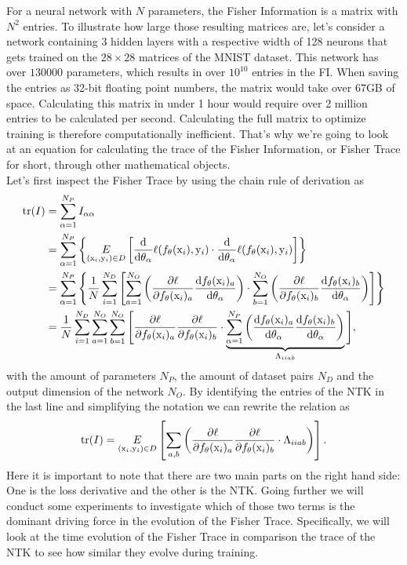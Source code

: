 For a neural network with $N$ parameters, the Fisher Information is a matrix with $N^2$ entries. To illustrate how large those resulting matrices are, let's consider a network containing 3 hidden layers with a respective width of 128 neurons that gets trained on the $28\times28$ matrices of the MNIST dataset. This network has over $130000$ parameters, which results in over $10^{10}$ entries in the FI. When saving the entries as 32-bit floating point numbers, the matrix would take over 67GB of space. Calculating  this matrix in under 1 hour would require over 2 million entries to be calculated per second. Calculating the full matrix to optimize training is therefore computationally inefficient. That's why we're going to look at an equation for calculating the trace of the Fisher Information, or Fisher Trace for short, through other mathematical objects.\\
Let's first inspect the Fisher Trace by using the chain rule of derivation as
\begin{equation}
	\begin{split}
		\mathrm{tr}(I) &= \sum_{\alpha = 1}^{N_P} I_{\alpha\alpha}\\
		&= \sum_{\alpha = 1}^{N_P} \left\{\underset{(\mathrm{x}_i, \mathrm{y}_i) \in D}{E} \left[\frac{\mathrm{d}}{\mathrm{d}\theta_\alpha}\ell(f_\theta(\mathrm{x}_i),\mathrm{y}_i)\cdot \frac{\mathrm{d}}{\mathrm{d}\theta_\alpha}\ell(f_\theta(\mathrm{x}_i),\mathrm{y}_i)\right]\right\}\\
		&= \sum_{\alpha = 1}^{N_P} \left\{ \frac{1}{N} \sum_{i = 1}^{N_D} \left[\sum_{a=1}^{N_O}\left(\frac{\partial\ell}{\partial f_\theta(\mathrm{x}_i)_a}\frac{\mathrm{d}f_\theta(\mathrm{x}_i)_a}{\mathrm{d}\theta_\alpha}\right)\cdot\sum_{b=1}^{N_O}\left(\frac{\partial\ell}{\partial f_\theta(\mathrm{x}_i)_b}\frac{\mathrm{d}f_\theta(\mathrm{x}_i)_b}{\mathrm{d}\theta_\alpha}\right)\right]\right\}\\
		&= \frac{1}{N} \sum_{i = 1}^{N_D} \sum_{a=1}^{N_O} \sum_{b=1}^{N_O} \Bigg[\frac{\partial\ell}{\partial f_\theta(\mathrm{x}_i)_a}\frac{\partial\ell}{\partial f_\theta(\mathrm{x}_i)_b} \cdot\underbrace{ \sum_{\alpha = 1}^{N_P} \left(\frac{\mathrm{d}f_\theta(\mathrm{x}_i)_a}{\mathrm{d}\theta_\alpha}\frac{\mathrm{d}f_\theta(\mathrm{x}_i)_b}{\mathrm{d}\theta_\alpha}\right)}_{\Lambda_{iiab}}\Bigg],
	\end{split} 
\end{equation}
with the amount of parameters $N_P$, the amount of dataset pairs $N_D$ and the output dimension of the network $N_O$. By identifying the entries of the NTK in the last line and simplifying the notation we can rewrite the relation as
\begin{equation}\label{eq:FisherNTKRelation}
	\mathrm{tr}(I) = \underset{(\mathrm{x}_i, \mathrm{y}_i) \in D}{E} \left[\sum_{a,b} \left(\frac{\partial\ell}{\partial f_\theta(\mathrm{x}_i)_a}\frac{\partial\ell}{\partial f_\theta(\mathrm{x}_i)_b} \cdot \Lambda_{iiab}\right)\right].
\end{equation}
Here it is important to note that there are two main parts on the right hand side: One is the loss derivative and the other is the NTK. Going further we will conduct some experiments to investigate which of those two terms is the dominant driving force in the evolution of the Fisher Trace. Specifically, we will look at the time evolution of the Fisher Trace in comparison the trace of the NTK to see how similar they evolve during training.\showthe\font